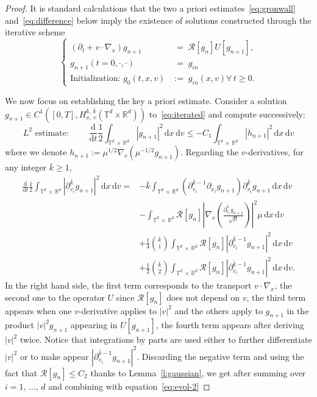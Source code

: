 \documentclass[10pt]{amsart}
\theoremstyle{definition}\newtheorem{defi}[theo]{Definition}\newtheorem{rema}[theo]{Remark}\newtheorem{exam}[theo]{Example}\newtheorem{exem}[theo]{Example}\newtheorem{nota}[theo]{Notation}
\newcommand{\R}{\mathbb{R}}
\newcommand{\T}{\mathbb{T}}
\newcommand*\fR{\mathcal{R}}
\newcommand\dt{{\frac{\mathrm d}{\mathrm dt}}}
\newcommand{\dd}{{\, \mathrm d}}
\let\oldforall\forall
\renewcommand*{\forall}{\mathrel{\oldforall}}
\begin{document}
\begin{proof}
It is standard calculations that the two a priori estimates~\eqref{eq:gronwall} and~\eqref{eq:difference} below imply the existence of solutions constructed through the iterative scheme
\begin{equation}\label{eq:iterated}
\begin{cases}
(\partial_t + v \cdot \nabla_x) g_{n+1} &\; =\; \fR [g_n] U[g_{n+1}],\\
 g_{n+1}(t=0,\cdot,\cdot)&\; =\; g_{in} \\
\text{Initialization: } g_0(t,x,v) & :=\; g_{in}(x,v)  \forall \, t \ge 0.
\end{cases}
\end{equation}

We now focus on establishing the key a priori estimate. Consider a solution $g_{n+1} \in C^1([0,T],H^{k,\,\bar k}_{x,\,v}(\T^d \times \R^d))$ to~\eqref{eq:iterated} and compute successively:
\begin{equation}\label{eq:evol-2}
L^2 \text{ estimate: } \qquad \dt \frac{1}2 \int_{\T^d\, \times\,\R^d} | g_{n+1}|^2\dd x \dd v \le - C_1
\int_{\T^d\,\times\,\R^d} |h_{n+1}|^2 \dd x \dd v
\end{equation}
where we denote $h_{n+1}:=\mu^{1/2} \nabla_v (\mu^{-1/2} g_{n+1})$. Regarding the $v$-derivatives, for any integer ${\bar k} \ge 1$,
\begin{align*}
\dt \frac12 \int_{\T^d\,\times\,\R^d} \left|\partial^{{\bar k}}_{v_i} g_{n+1}\right|^2 \dd x \dd v = &- {\bar k} \int_{\T^d\, \times\,\R^d} \left(\partial^{{\bar k}-1} _{v_i} \partial_{x_i} g_{n+1}\right) \partial^{{\bar k}}_{v_i} g_{n+1} \dd x \dd v \\
&- \int_{\T^d\,\times\,\R^d} \fR[g_n] \left| \nabla_v \left(\frac{\partial^{{\bar k}} _{v_i} g_{n+1}}{\sqrt \mu} \right) \right|^2 \mu \dd x \dd v\\
& + \frac14 \binom{{\bar k}}1 \int_{\T^d\,\times\,\R^d} \fR[g_n] \left| \partial^{{\bar k} - 1} _{v_i} g_{n+1} \right|^2 \dd x \dd v \\
& + \frac12 \binom{{\bar k}}2 \int_{\T^d\,\times\,\R^d} \fR[g_n] \left| \partial^{{\bar k}-1} _{v_i} g_{n+1} \right|^2 \dd x \dd v.
\end{align*}
In the right hand side, the first term corresponds to the transport $v \cdot \nabla_x$, the second one to the operator $U$ since $\fR[g_n]$ does not depend on $v$, the third term appears when one $v$-derivative applies to $|v|^2$ and the others apply to $g_{n+1}$ in the product $|v|^2 g_{n+1}$ appearing in $U[g_{n+1}]$, the fourth term appears after deriving $|v|^2$ twice. Notice that integrations by parts are used either to further differentiate $|v|^2$ or to make appear $|\partial_{v_i}^{{\bar k}-1}g_{n+1}|^2$. Discarding the negative term and using the fact that $\fR[g_n] \le C_2$ thanks to Lemma~\ref{l:gaussian}, we get after summing over $i =1,\,\dots,\,d$ and combining with equation~\eqref{eq:evol-2}

\end{proof}
\end{document}

